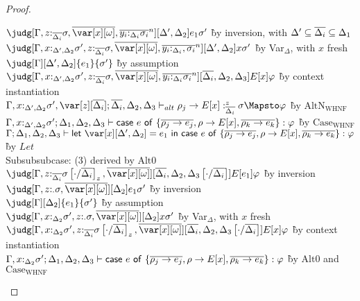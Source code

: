 \begin{proof}
\begin{tabbing}
       $\judg[\G, z{:}_{\ov{\Delta_i}} \sigma,\ov{\xo},\ov{y_i{:}_{\D_i}\s_i}^n][\D',\D_2]{e_1}{\sigma'}$
       \` by inversion, with $\Delta' \subseteq \overline{\Delta_i} \subseteq \Delta_1$\\
       $\judg[\G, x{:}_{\D',\D_2}\sigma', z{:}_{\ov{\Delta_i}} \sigma,\ov{\xo},\ov{y_i{:}_{\D_i},\s_i}^n][\D',\D_2]{x}{\sigma'}$
       \` by Var$_\Delta$, with $x$ fresh\\
      $\judg[\G][\D',\D_2]{e_1}{\sigma'}$
       \` by assumption\\
       $\judg[\G,
       x{:}_{\D',\D_2}\sigma', z{:}_{\ov{\Delta_i}} \sigma,\ov{\xo},\ov{y_i{:}_{\D_i}\s_i}^n][\ov{\D_i},\D_2,\D_3]{E[x]}{\vp}$
       \` by context instantiation\\
       $\G,x{:}_{\D',\D_2}\sigma',\var[z][\ov{\D_i}];\ov{\D_i},\D_2,\D_3 \vdash_{alt} \rho_j
       \to E[x] :^z_{\ov{\D_i}} \s \Mapsto \vp$ \` by
       $\textrm{AltN}_{\textrm{WHNF}}$\\
       $\Gamma,x{:}_{\Delta',\Delta_2}\sigma'; \Delta_1,\Delta_2,\Delta_3 \vdash \mathsf{case}~e~\mathsf{of}~\{\overline{\rho_j\to e_j}, \rho \to
  E[x], \overline{\rho_k\to e_k}\} : \varphi$ \` by $\textrm{Case}_\textrm{WHNF}$\\
       $\G ; \D_1 , \D_2 , \D_3 \vdash \llet{\x[\D',\D_2] = e_1}{\ccase{e}{\{\overline{\rho_j\to e_j}, \rho \to
           E[x], \overline{\rho_k\to e_k}\}}} : \vp$ \` by $\mathit{Let}$\\
       Subsubsubcase: (3) derived by $\textrm{Alt}0$\\
       $\judg[\subst{\G, z{:}_{\ov{\Delta_i}} \sigma}{\cdot}{\ov{\D_i}}_z,\ov{\xo}][\subst{\ov{\D_i},\D_2,\D_3}{\cdot}{\ov{\D_i}}]{E[e_1]}{\vp}$
       \` by inversion\\
       $\judg[\G,z{:}_{\cdot}\s,\ov{\xo}][\D_2]{e_1}{\sigma'}$
       \` by inversion\\
       $\judg[\G][\D_2]{e_1}{\sigma'}$ \` by assumption\\
       $\judg[\G,x{:}_{\D_2}\sigma' , z{:}_{\cdot}\s,\ov{\xo}][\D_2]{x}{\sigma'}$ \` by Var$_\Delta$, with $x$ fresh\\
       $\judg[\subst{\G,x{:}_{\D_2}\sigma', z{:}_{\ov{\Delta_i}}
         \sigma }{\cdot}{\ov{\D_i}}_z,\ov{\xo}][\subst{\ov{\D_i},\D_2,\D_3}{\cdot}{\ov{\D_i}}]{E[x]}{\vp}$
       \` by context instantiation\\
             $\Gamma,x{:}_{\Delta_2}\sigma'; \Delta_1,\Delta_2,\Delta_3 \vdash \mathsf{case}~e~\mathsf{of}~\{\overline{\rho_j\to e_j}, \rho \to
  E[x], \overline{\rho_k\to e_k}\} : \varphi$ \` by $\textrm{Alt}0$ and
$\textrm{Case}_\textrm{WHNF}$\\

\end{tabbing}
\end{proof}

